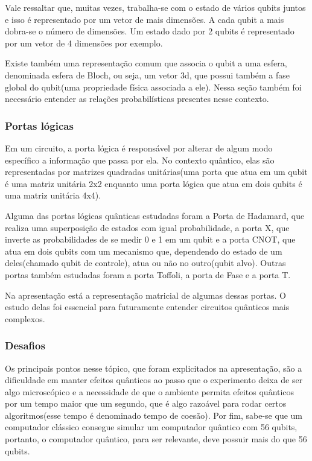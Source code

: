 \documentclass{article}
\begin{document}
        Vale ressaltar que, muitas vezes, trabalha-se com o estado de vários qubits juntos e isso é representado por um vetor de mais dimensões. A cada qubit a mais dobra-se o número de dimensões. Um estado dado por 2 qubits é representado por um vetor de 4 dimensões por exemplo.
        
        Existe também uma representação comum que associa o qubit a uma esfera, denominada esfera de Bloch, ou seja, um vetor 3d, que possui também a fase global do qubit(uma propriedade física associada a ele). Nessa seção também foi necessário entender as relações  probabilísticas presentes nesse contexto.
    
        \subsubsection{Portas lógicas}
        Em um circuito, a porta lógica é responsável por alterar de algum modo específico a informação que passa por ela. No contexto quântico, elas são representadas por matrizes quadradas unitárias(uma porta que atua em um qubit é uma matriz unitária 2x2 enquanto uma porta lógica que atua em dois qubits é uma matriz unitária 4x4).
    
        Alguma das portas lógicas quânticas estudadas foram a Porta de Hadamard, que realiza uma superposição de estados com igual probabilidade, a porta X, que inverte as probabilidades de se medir 0 e 1 em um qubit e a porta CNOT, que atua em dois qubits com um mecanismo que, dependendo do estado de um deles(chamado qubit de controle), atua ou não no outro(qubit alvo). Outras portas também estudadas foram a porta Toffoli, a porta de Fase e a porta T.
    
        Na apresentação está a representação matricial de algumas dessas portas. O estudo delas foi essencial para futuramente entender circuitos quânticos mais complexos.
    
        \subsubsection{Desafios}
        Os principais pontos nesse tópico, que foram explicitados na apresentação, são a dificuldade em manter efeitos quânticos ao passo que o experimento deixa de ser algo microscópico e a necessidade de que o ambiente permita efeitos quânticos por um tempo maior que um segundo, que é algo razoável para rodar certos algoritmos(esse tempo é denominado tempo de coesão). Por fim, sabe-se que um computador clássico consegue simular um computador quântico com 56 qubits, portanto, o computador quântico, para ser relevante, deve possuir mais do que 56 qubits.
\end{document}
